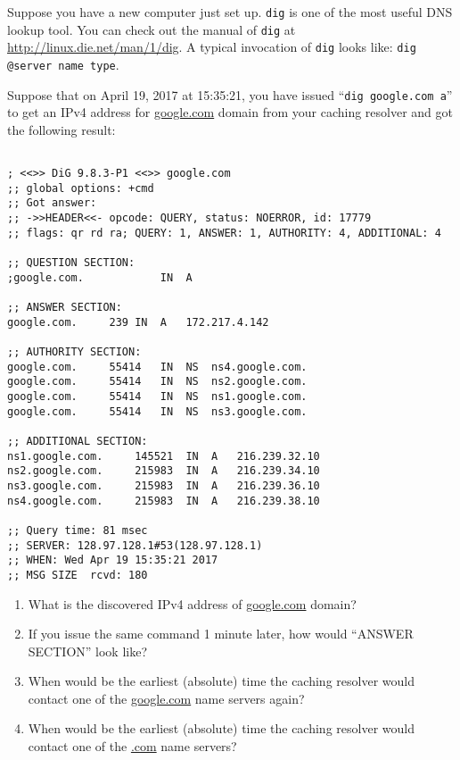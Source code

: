 \documentclass{report}
\begin{document}
\mktitle


\begin{problem}

Suppose you have a new computer just set up. \verb|dig| is one of the most useful DNS lookup tool.
You can check out the manual of \verb|dig| at \url{http://linux.die.net/man/1/dig}.
A typical invocation of \verb|dig| looks like:
\verb|dig @server name type|.

Suppose that on April 19, 2017 at 15:35:21, you have issued ``\verb|dig google.com a|'' to get an IPv4 address for \url{google.com} domain from your caching resolver and got the following result:

\begin{lstlisting}

; <<>> DiG 9.8.3-P1 <<>> google.com
;; global options: +cmd
;; Got answer:
;; ->>HEADER<<- opcode: QUERY, status: NOERROR, id: 17779
;; flags: qr rd ra; QUERY: 1, ANSWER: 1, AUTHORITY: 4, ADDITIONAL: 4

;; QUESTION SECTION:
;google.com.			IN	A

;; ANSWER SECTION:
google.com.		239	IN	A	172.217.4.142

;; AUTHORITY SECTION:
google.com.		55414	IN	NS	ns4.google.com.
google.com.		55414	IN	NS	ns2.google.com.
google.com.		55414	IN	NS	ns1.google.com.
google.com.		55414	IN	NS	ns3.google.com.

;; ADDITIONAL SECTION:
ns1.google.com.		145521	IN	A	216.239.32.10
ns2.google.com.		215983	IN	A	216.239.34.10
ns3.google.com.		215983	IN	A	216.239.36.10
ns4.google.com.		215983	IN	A	216.239.38.10

;; Query time: 81 msec
;; SERVER: 128.97.128.1#53(128.97.128.1)
;; WHEN: Wed Apr 19 15:35:21 2017
;; MSG SIZE  rcvd: 180

\end{lstlisting}

\begin{enumerate}

\item What is the discovered IPv4 address of \url{google.com} domain?

\item If you issue the same command 1 minute later, how would ``ANSWER SECTION'' look like?

\item When would be the earliest (absolute) time the caching resolver would contact one of the \url{google.com} name servers again?

\item When would be the earliest (absolute) time the caching resolver would contact one of the \url{.com} name servers?


\end{enumerate}
\end{problem}
\end{document}
